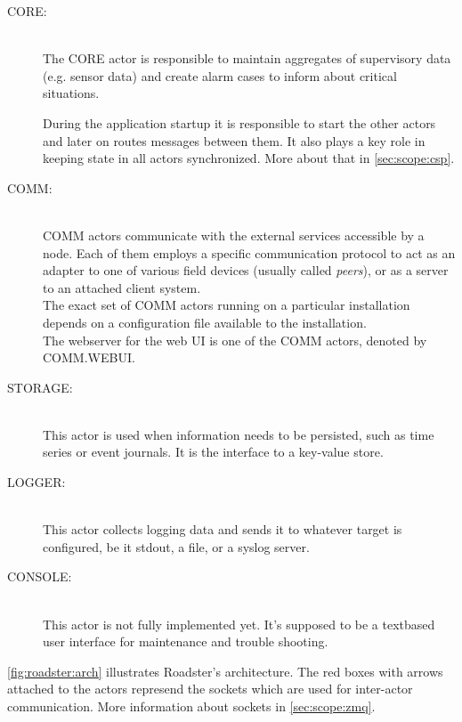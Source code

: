 \begin{description}
	\item [CORE:]\hfill\\
		The CORE actor is responsible to maintain aggregates of supervisory data
		(e.g. sensor data) and create alarm cases to inform
		about critical situations.

		During the application startup it is responsible to start the
		other actors and later on routes messages between them. It also
		plays a key role in keeping state in all actors synchronized. More
		about that in \autoref{sec:scope:csp}.

	\item [COMM:]\hfill\\
		COMM actors communicate with the external services accessible
		by a node. Each of them employs a specific communication
		protocol to act as an adapter to one of various field devices
		(usually called \emph{peers}), or as a server to an attached client
		system.\\

		The exact set of COMM actors running on a particular
		installation depends on a configuration file available to the
		installation.\\

		The webserver for the web UI is one of the COMM actors, denoted
		by COMM.WEBUI.

	\item [STORAGE:]\hfill\\
		This actor is used when information needs to be persisted, such
		as time series or event journals. It is the interface to a
		key-value store.

	\item [LOGGER:]\hfill\\
		This actor collects logging data and sends it to whatever
		target is configured, be it \gls{stdout}, a file, or a syslog server.

	\item [CONSOLE:]\hfill\\
		This actor is not fully implemented yet. It's supposed to
		be a textbased user interface for maintenance and trouble shooting.
\end{description}

\autoref{fig:roadster:arch} illustrates Roadster's architecture. The red boxes
with arrows attached to the actors represend the \zmq sockets which are used
for inter-actor communication. More information about \zmq sockets in
\autoref{sec:scope:zmq}.

